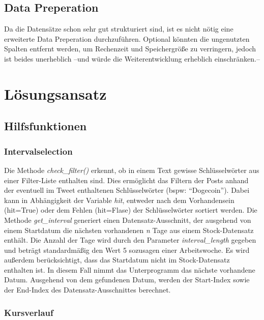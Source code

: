 \documentclass{article}
\begin{document}
\subsection{Data Preperation}
Da die Datensätze schon sehr gut strukturiert sind, ist es nicht nötig eine erweiterte Data Preperation durchzuführen.
Optional könnten die ungenutzten Spalten entfernt werden, um Rechenzeit und Speichergröße zu verringern, jedoch ist beides unerheblich --und würde die Weiterentwicklung erheblich einschränken.--



\section{Lösungsansatz}


\subsection{Hilfsfunktionen}

\subsubsection{Intervalselection}
Die Methode \textit{check\_filter()} erkennt, ob in einem Text gewisse Schlüsselwörter aus einer Filter-Liste enthalten sind.
Dies ermöglicht das Filtern der Posts anhand der eventuell im Tweet enthaltenen Schlüsselwörter (bspw: ``Dogecoin'').
Dabei kann in Abhängigkeit der Variable \textit{hit}, entweder nach dem Vorhandensein (hit=True) oder dem Fehlen (hit=Flase) der Schlüsselwörter sortiert werden.
Die Methode \textit{get\_interval} generiert einen Datensatz-Ausschnitt, der ausgehend von einem Startdatum die nächsten vorhandenen \textit{n} Tage aus einem Stock-Datensatz enthält.
Die Anzahl der Tage wird durch den Parameter \textit{interval\_length} gegeben und beträgt standardmäßig den Wert 5 sozusagen einer Arbeitswoche.
Es wird außerdem berücksichtigt, dass das Startdatum nicht im Stock-Datensatz enthalten ist.
In diesem Fall nimmt das Unterprogramm das nächste vorhandene Datum.
Ausgehend von dem gefundenen Datum, werden der Start-Index sowie der End-Index des Datensatz-Ausschnittes berechnet.

\subsubsection{Kursverlauf}
\end{document}
